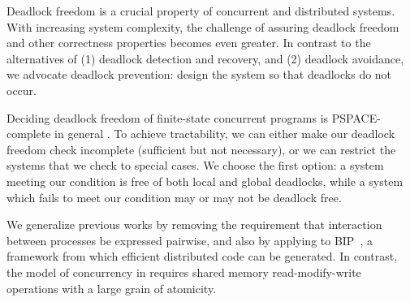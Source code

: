 
Deadlock freedom is a crucial property of concurrent and
distributed systems. With increasing system complexity,
the challenge of assuring deadlock freedom and other correctness
properties becomes even greater.
In contrast to the alternatives of (1) deadlock detection and recovery,
and (2) deadlock avoidance, we advocate deadlock prevention:
design the system so that deadlocks do not occur.

Deciding deadlock freedom
of finite-state concurrent programs is PSPACE-complete in general
\cite[chapter 19]{papadimitriou1994computational}. To achieve
tractability, we can either make our deadlock freedom check
incomplete (sufficient but not necessary), or we 
can restrict the systems that we
check to special cases.  We choose the first option: a system
meeting our condition is free of both local and global
deadlocks, while a
system which fails to meet our condition may or may not be
deadlock free.

We generalize previous works \cite{Att99a,AC05,AE98} by removing
the requirement that interaction between processes be expressed pairwise, 
and also by applying to BIP~\cite{bip06}, a framework from which efficient
distributed code can be generated. In contrast, the model of concurrency
in \cite{Att99a,AC05,AE98} requires shared memory
read-modify-write operations with a large grain of atomicity.



